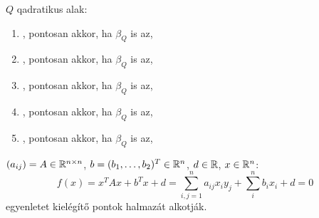 \begin{ff}
	$Q$ qadratikus alak:
	\begin{enumerate}
		\item {}, pontosan akkor, ha $\beta_Q$ is az,
		\item {}, pontosan akkor, ha $\beta_Q$ is az,
		\item {}, pontosan akkor, ha $\beta_Q$ is az,
		\item {}, pontosan akkor, ha $\beta_Q$ is az,
		\item {}, pontosan akkor, ha $\beta_Q$ is az,
	\end{enumerate}
\end{ff}

\begin{ff}
	$(a_{ij})=A\in\mathbb{R}^{n\times n}$, $b=(b_1,\ldots,b_2)^T\in\mathbb{R}^n$, $d\in\mathbb{R}$, $x\in\mathbb{R}^n$:
	\begin{equation*}
		f(x)=x^TAx+b^Tx+d=\sum_{i,j=1}^na_{ij}x_iy_j+\sum_i^nb_ix_i+d=0
	\end{equation*}
	egyenletet kielégítő pontok  halmazát alkotják.
\end{ff}
